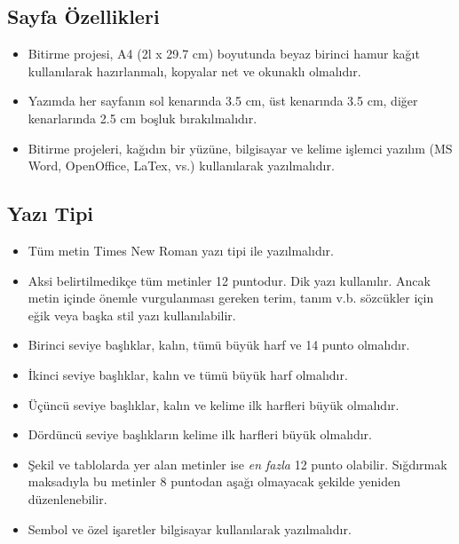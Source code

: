 \subsection{Sayfa Özellikleri}
\begin{itemize}
\item Bitirme projesi, A4 (2l x 29.7 cm) boyutunda beyaz birinci hamur kağıt kullanılarak hazırlanmalı, kopyalar net ve okunaklı olmalıdır. 
\item Yazımda her sayfanın sol kenarında 3.5 cm, üst kenarında 3.5 cm, diğer kenarlarında 2.5 cm boşluk bırakılmalıdır. 
\item Bitirme projeleri, kağıdın bir yüzüne, bilgisayar ve kelime işlemci yazılım (MS Word, OpenOffice, LaTex, vs.) kullanılarak yazılmalıdır. 
\end{itemize}

\subsection{Yazı Tipi}
\begin{itemize}
\item Tüm metin Times New Roman yazı tipi ile yazılmalıdır. 
\item Aksi belirtilmedikçe tüm metinler 12 puntodur. Dik yazı kullanılır. Ancak metin içinde önemle vurgulanması gereken terim, tanım v.b. sözcükler için eğik veya başka stil yazı kullanılabilir.
\item Birinci seviye başlıklar, kalın, tümü büyük harf ve 14 punto olmalıdır. 
\item İkinci seviye başlıklar, kalın ve tümü büyük harf olmalıdır. 
\item Üçüncü seviye başlıklar, kalın ve kelime ilk harfleri büyük olmalıdır. 
\item Dördüncü seviye başlıkların kelime ilk harfleri büyük olmalıdır. 
\item Şekil ve tablolarda yer alan metinler ise \textit{en fazla} 12 punto olabilir. Sığdırmak maksadıyla bu metinler 8 puntodan aşağı olmayacak şekilde yeniden düzenlenebilir.
\item Sembol ve özel işaretler bilgisayar kullanılarak yazılmalıdır.
\end{itemize}

